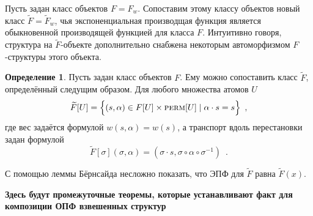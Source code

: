 \documentclass[a5paper]{article}
\theoremstyle{definition}
\newtheorem*{definition}{Определение}
\begin{document}
Пусть задан класс объектов \( F = F_w \). Сопоставим этому классу объектов новый класс
\( \widetilde F = \widetilde F_w \), чья экспоненциальная производщая функция является
обыкновенной производящей функцией для класса \( F \). Интуитивно говоря, структура
на \( \widetilde F \)-объекте дополнительно снабжена некоторым автоморфизмом \( F
\)-структуры этого объекта.
\begin{definition}
    Пусть задан класс объектов \( F \). Ему можно сопоставить класс \( \widetilde
F \), определённый следущим образом. Для любого множества атомов \( U \)
\[
    \widetilde F[U] = \Big\{
        (s, \alpha) \in F[U] \times \text{\textsc{perm}}[U] \mid
         \alpha \cdot s = s
    \Big\} \enspace ,
\]
где вес задаётся формулой \(w(s, \alpha) = w(s) \), а  транспорт вдоль перестановки задан формулой
\[
    \widetilde F[\sigma](\sigma, \alpha) = (\sigma \cdot s, \sigma \circ \alpha
\circ \sigma^{-1} ) \enspace .
\]
\end{definition}
С помощью леммы Бёрнсайда несложно показать, что ЭПФ для \( \widetilde F  \)
равна \( \widetilde F(x) \).


\textbf{Здесь будут промежуточные теоремы, которые устанавливают факт для
композиции ОПФ взвешенных структур}

\end{document}

